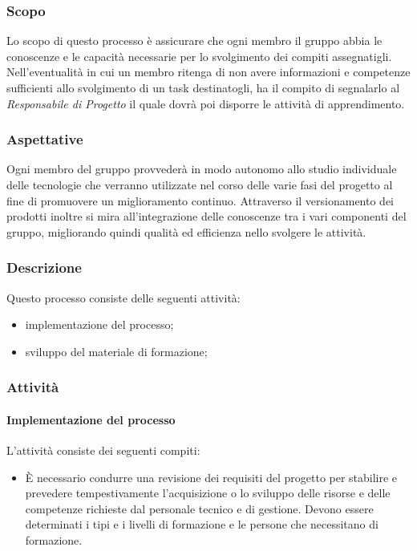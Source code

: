 	\subsubsection{Scopo}
	Lo scopo di questo processo è assicurare che ogni membro il gruppo abbia le conoscenze e le capacità necessarie per lo svolgimento dei compiti assegnatigli. Nell'eventualità in cui un membro ritenga di non avere informazioni e competenze sufficienti allo svolgimento di un task destinatogli, ha il compito di segnalarlo al \textit{Responsabile di Progetto} il quale dovrà poi disporre le attività di apprendimento.\\
	\subsubsection{Aspettative}
	Ogni membro del gruppo provvederà in modo autonomo allo studio individuale delle tecnologie che verranno utilizzate nel corso delle varie fasi del progetto al fine di promuovere un miglioramento continuo. Attraverso il versionamento dei prodotti inoltre si mira all'integrazione delle conoscenze tra i vari componenti del gruppo, migliorando quindi qualità ed efficienza nello svolgere le attività.
	
		
		\subsubsection{Descrizione}
		Questo processo consiste delle seguenti attività:
		\begin{itemize}
			\item implementazione del processo;
			\item sviluppo del materiale di formazione;
		\end{itemize}
		\subsubsection{Attività}
		\paragraph{Implementazione del processo}
		L'attività consiste dei seguenti compiti:
		\begin{itemize}
			\item È necessario condurre una revisione dei requisiti del progetto per stabilire e prevedere tempestivamente l'acquisizione o lo sviluppo delle risorse e delle competenze richieste dal personale tecnico e di gestione. Devono essere determinati i tipi e i livelli di formazione e le persone che necessitano di formazione. 
		\end{itemize}
